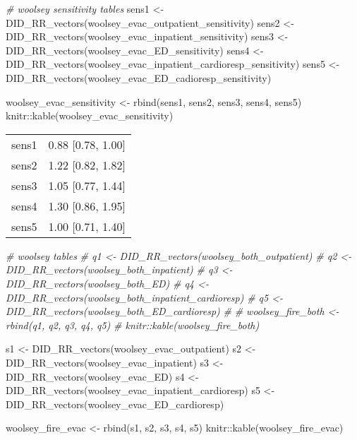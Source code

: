 \documentclass[
]{article}
\newenvironment{Shaded}{\begin{snugshade}}{\end{snugshade}}
\newcommand{\CommentTok}[1]{\textcolor[rgb]{0.56,0.35,0.01}{\textit{#1}}}
\newcommand{\FunctionTok}[1]{\textcolor[rgb]{0.00,0.00,0.00}{#1}}
\newcommand{\NormalTok}[1]{#1}
\newcommand{\OtherTok}[1]{\textcolor[rgb]{0.56,0.35,0.01}{#1}}
\newcommand{\SpecialCharTok}[1]{\textcolor[rgb]{0.00,0.00,0.00}{#1}}
\begin{document}
\begin{Shaded}
\begin{Highlighting}[]
\CommentTok{\# woolsey sensitivity tables}
\NormalTok{sens1 }\OtherTok{\textless{}{-}} \FunctionTok{DID\_RR\_vectors}\NormalTok{(woolsey\_evac\_outpatient\_sensitivity)}
\NormalTok{sens2 }\OtherTok{\textless{}{-}} \FunctionTok{DID\_RR\_vectors}\NormalTok{(woolsey\_evac\_inpatient\_sensitivity)}
\NormalTok{sens3 }\OtherTok{\textless{}{-}} \FunctionTok{DID\_RR\_vectors}\NormalTok{(woolsey\_evac\_ED\_sensitivity)}
\NormalTok{sens4 }\OtherTok{\textless{}{-}} \FunctionTok{DID\_RR\_vectors}\NormalTok{(woolsey\_evac\_inpatient\_cardioresp\_sensitivity)}
\NormalTok{sens5 }\OtherTok{\textless{}{-}} \FunctionTok{DID\_RR\_vectors}\NormalTok{(woolsey\_evac\_ED\_cadioresp\_sensitivity)}

\NormalTok{woolsey\_evac\_sensitivity }\OtherTok{\textless{}{-}} \FunctionTok{rbind}\NormalTok{(sens1, sens2, sens3, sens4, sens5)}
\NormalTok{knitr}\SpecialCharTok{::}\FunctionTok{kable}\NormalTok{(woolsey\_evac\_sensitivity)}
\end{Highlighting}
\end{Shaded}

\begin{longtable}[]{@{}ll@{}}
\toprule()
\endhead
sens1 & 0.88 {[}0.78, 1.00{]} \\
sens2 & 1.22 {[}0.82, 1.82{]} \\
sens3 & 1.05 {[}0.77, 1.44{]} \\
sens4 & 1.30 {[}0.86, 1.95{]} \\
sens5 & 1.00 {[}0.71, 1.40{]} \\
\bottomrule()
\end{longtable}

\begin{Shaded}
\begin{Highlighting}[]
\CommentTok{\# woolsey tables}
\CommentTok{\# q1 \textless{}{-} DID\_RR\_vectors(woolsey\_both\_outpatient)}
\CommentTok{\# q2 \textless{}{-} DID\_RR\_vectors(woolsey\_both\_inpatient)}
\CommentTok{\# q3 \textless{}{-} DID\_RR\_vectors(woolsey\_both\_ED)}
\CommentTok{\# q4 \textless{}{-} DID\_RR\_vectors(woolsey\_both\_inpatient\_cardioresp)}
\CommentTok{\# q5 \textless{}{-} DID\_RR\_vectors(woolsey\_both\_ED\_cardioresp)}
\CommentTok{\# }
\CommentTok{\# woolsey\_fire\_both \textless{}{-} rbind(q1, q2, q3, q4, q5)}
\CommentTok{\# knitr::kable(woolsey\_fire\_both)}

\NormalTok{s1 }\OtherTok{\textless{}{-}} \FunctionTok{DID\_RR\_vectors}\NormalTok{(woolsey\_evac\_outpatient)}
\NormalTok{s2 }\OtherTok{\textless{}{-}} \FunctionTok{DID\_RR\_vectors}\NormalTok{(woolsey\_evac\_inpatient)}
\NormalTok{s3 }\OtherTok{\textless{}{-}} \FunctionTok{DID\_RR\_vectors}\NormalTok{(woolsey\_evac\_ED)}
\NormalTok{s4 }\OtherTok{\textless{}{-}} \FunctionTok{DID\_RR\_vectors}\NormalTok{(woolsey\_evac\_inpatient\_cardioresp)}
\NormalTok{s5 }\OtherTok{\textless{}{-}} \FunctionTok{DID\_RR\_vectors}\NormalTok{(woolsey\_evac\_ED\_cardioresp)}

\NormalTok{woolsey\_fire\_evac }\OtherTok{\textless{}{-}} \FunctionTok{rbind}\NormalTok{(s1, s2, s3, s4, s5)}
\NormalTok{knitr}\SpecialCharTok{::}\FunctionTok{kable}\NormalTok{(woolsey\_fire\_evac)}
\end{Highlighting}
\end{Shaded}
\end{document}
